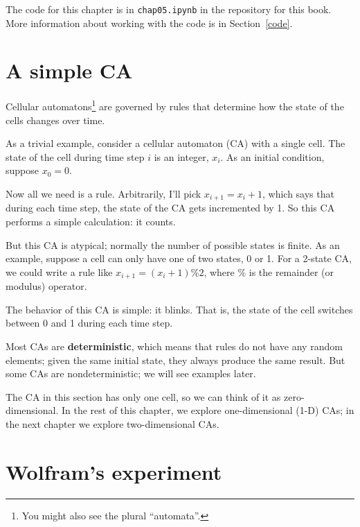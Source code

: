 \documentclass[12pt]{book}
\theoremstyle{exercise}
\begin{document}
The code for this chapter is in {\tt chap05.ipynb} in the repository
for this book.  More information about working with the code is
in Section~\ref{code}.


\section{A simple CA}

Cellular automatons\footnote{You might also see the plural
  ``automata''.} are governed by rules that determine how the state of
the cells changes over time.


As a trivial example, consider a cellular automaton (CA) with
a single cell.  The state of the cell during time step $i$ is an integer, $x_i$.  As an initial condition, suppose $x_0 = 0$.


Now all we need is a rule.  Arbitrarily, I'll pick $x_{i+1} = x_{i} + 1$,
which says that during each time step, the state of the CA gets
incremented by 1.  So this CA performs a simple calculation: it counts.


But this CA is atypical; normally the number of
possible states is finite.  As an example, suppose a cell can only have one of two states, 0 or 1.  For a 2-state CA, we could write a rule like
$x_{i+1} = (x_{i} + 1) \% 2$, where $\%$ is the remainder (or
modulus) operator.

The behavior of this CA is simple: it blinks.  That is,
the state of the cell switches between 0 and 1 during each time step.

Most CAs are {\bf deterministic}, which means that rules do not
have any random elements; given the same initial state, they
always produce the same result.  But some CAs are nondeterministic;
we will see examples later.


The CA in this section has only one cell, so we can think of
it as zero-dimensional.  In the rest
of this chapter, we explore one-dimensional (1-D) CAs; in the next chapter
we explore two-dimensional CAs.



\section{Wolfram's experiment}
\label{onedim}
\end{document}
